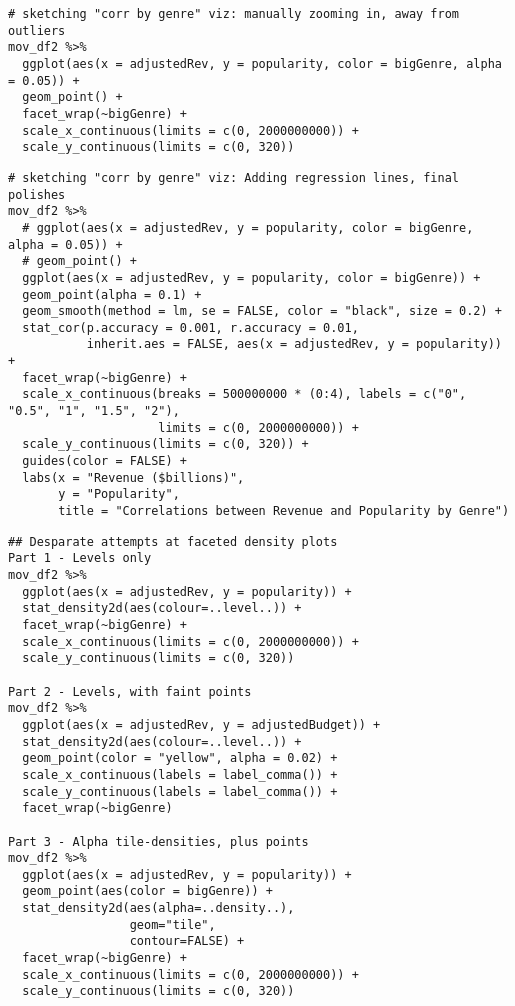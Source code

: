 \begin{lstlisting}
# sketching "corr by genre" viz: manually zooming in, away from outliers
mov_df2 %>%
  ggplot(aes(x = adjustedRev, y = popularity, color = bigGenre, alpha = 0.05)) +
  geom_point() +
  facet_wrap(~bigGenre) +
  scale_x_continuous(limits = c(0, 2000000000)) +
  scale_y_continuous(limits = c(0, 320))
\end{lstlisting}

\begin{lstlisting}
# sketching "corr by genre" viz: Adding regression lines, final polishes
mov_df2 %>%
  # ggplot(aes(x = adjustedRev, y = popularity, color = bigGenre, alpha = 0.05)) +
  # geom_point() +
  ggplot(aes(x = adjustedRev, y = popularity, color = bigGenre)) +
  geom_point(alpha = 0.1) +
  geom_smooth(method = lm, se = FALSE, color = "black", size = 0.2) +
  stat_cor(p.accuracy = 0.001, r.accuracy = 0.01,
           inherit.aes = FALSE, aes(x = adjustedRev, y = popularity)) +
  facet_wrap(~bigGenre) +
  scale_x_continuous(breaks = 500000000 * (0:4), labels = c("0", "0.5", "1", "1.5", "2"),
                     limits = c(0, 2000000000)) +
  scale_y_continuous(limits = c(0, 320)) +
  guides(color = FALSE) +
  labs(x = "Revenue ($billions)",
       y = "Popularity",
       title = "Correlations between Revenue and Popularity by Genre")
\end{lstlisting}

\begin{lstlisting}
## Desparate attempts at faceted density plots
Part 1 - Levels only
mov_df2 %>%
  ggplot(aes(x = adjustedRev, y = popularity)) +
  stat_density2d(aes(colour=..level..)) +
  facet_wrap(~bigGenre) +
  scale_x_continuous(limits = c(0, 2000000000)) +
  scale_y_continuous(limits = c(0, 320))

Part 2 - Levels, with faint points
mov_df2 %>%
  ggplot(aes(x = adjustedRev, y = adjustedBudget)) +
  stat_density2d(aes(colour=..level..)) +
  geom_point(color = "yellow", alpha = 0.02) +
  scale_x_continuous(labels = label_comma()) +
  scale_y_continuous(labels = label_comma()) +
  facet_wrap(~bigGenre)

Part 3 - Alpha tile-densities, plus points
mov_df2 %>%
  ggplot(aes(x = adjustedRev, y = popularity)) + 
  geom_point(aes(color = bigGenre)) +
  stat_density2d(aes(alpha=..density..),
                 geom="tile",
                 contour=FALSE) +
  facet_wrap(~bigGenre) +
  scale_x_continuous(limits = c(0, 2000000000)) +
  scale_y_continuous(limits = c(0, 320))
\end{lstlisting}

